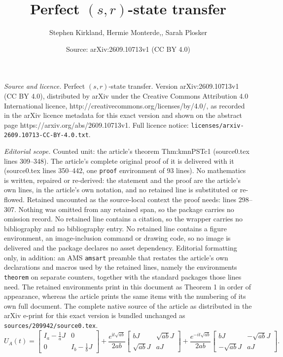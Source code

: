 \documentclass[10pt,a4paper]{amsart}
\title{Perfect $(s,r)$-state transfer}
\author{Stephen Kirkland, Hermie Monterde,, Sarah Plosker}
\date{Source: arXiv:2609.10713v1 (CC BY 4.0)}
\def\ii{\mathrm{i}}
\begin{document}
\maketitle

\noindent\emph{Source and licence.} Perfect $(s,r)$-state transfer. Version arXiv:2609.10713v1 (CC BY 4.0), distributed by arXiv under the Creative Commons Attribution 4.0 International licence, http://creativecommons.org/licenses/by/4.0/, as recorded in the arXiv licence metadata for this exact version and shown on the abstract page https://arxiv.org/abs/2609.10713v1. Full licence notice: \texttt{licenses/arxiv-2609.10713-CC-BY-4.0.txt}.\par\smallskip

\noindent\textit{Editorial scope.} Counted unit: the article's theorem Thm:kmnPSTc1 (source0.tex lines 309--348). The article's complete original proof of it is delivered with it (source0.tex lines 350--442, one \texttt{proof} environment of 93 lines). No mathematics is written, repaired or re-derived: the statement and the proof are the article's own lines, in the article's own notation, and no retained line is substituted or re-flowed.  Retained uncounted as the source-local context the proof needs: lines 298--307.  Nothing was omitted from any retained span, so the package carries no omission record.  No retained line contains a citation, so the wrapper carries no bibliography and no bibliography entry.  No retained line contains a figure environment, an image-inclusion command or drawing code, so no image is delivered and the package declares no asset dependency.  Editorial formatting only, in addition: an AMS \texttt{amsart} preamble that restates the article's own declarations and macros used by the retained lines, namely the environments \texttt{theorem} on separate counters, together with the standard packages those lines need.  The retained environments print in this document as Theorem 1 in order of appearance, whereas the article prints the same items with the numbering of its own full document.  The complete native source of the article as distributed in the arXiv e-print for this exact version is bundled unchanged as \texttt{sources/209942/source0.tex}.
\begin{equation}
\label{Eq:completebip}
U_A(t)=\begin{bmatrix}
I_a-\frac{1}{a}J&0 \\ 0&I_b-\frac{1}{b}J
\end{bmatrix}+\frac{e^{\ii t\sqrt{ab}}}{2ab}\begin{bmatrix}
bJ&\sqrt{ab}J \\ \sqrt{ab}J&aJ
\end{bmatrix}+\frac{e^{-it\sqrt{ab}}}{2ab}\begin{bmatrix}
bJ&-\sqrt{ab}J \\ -\sqrt{ab}J&aJ
\end{bmatrix}.
\end{equation}
\end{document}
